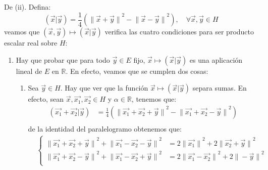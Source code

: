 \documentclass[12pt]{report}
\newcounter{it}
\theoremstyle{largebreak}
\newcommand\pint[2]{\ensuremath{\left(#1\big|#2\right)}}
\newcommand\norm[1]{\ensuremath{\|#1\|}}
\begin{document}
\begin{sol}
        De (ii). Defina:
        \begin{equation*}
            \pint{\vec{x}}{\vec{y}}=\frac{1}{4}\left(\norm{\vec{x}+\vec{y}}^2-\norm{\vec{x}-\vec{y}}^2 \right),\quad\forall\vec{x},\vec{y}\in H
        \end{equation*}
        veamos que $(\vec{x},\vec{y})\mapsto\pint{\vec{x}}{\vec{y}}$ verifica las cuatro condiciones para ser producto escalar real sobre $H$:
        \begin{enumerate}
            \item Hay que probar que para todo $\vec{y}\in E$ fijo, $\vec{x}\mapsto\pint{\vec{x}}{\vec{y}}$ es una aplicación lineal de $E$ en $\mathbb{R}$. En efecto, veamos que se cumplen dos cosas:
            \begin{enumerate}
                \item Sea $\vec{y}\in H$. Hay que ver que la función $\vec{x}\mapsto\pint{\vec{x}}{\vec{y}}$ separa sumas. En efecto, sean $\vec{x},\vec{x_1},\vec{x_2}\in H$ y $\alpha\in\mathbb{R}$, tenemos que:
                \begin{equation*}
                    \begin{split}
                        \pint{\vec{x_1}+\vec{x_2}}{\vec{y}}&=\frac{1}{4}\left(\norm{\vec{x_1}+\vec{x_2}+\vec{y}}^2-\norm{\vec{x_1}+\vec{x_2}-\vec{y}}^2 \right)\\
                    \end{split}
                \end{equation*}
                de la identidad del paralelogramo obtenemos que:
                \begin{equation*}
                    \begin{split}
                        &\left\{
                            \begin{array}{rl}
                                \norm{\vec{x_1}+\vec{x_2}+\vec{y}}^2+\norm{\vec{x_1}-\vec{x_2}-\vec{y}}^2&=2\norm{\vec{x_1}}^2+2\norm{\vec{x_2}+\vec{y}}^2\\
                                \norm{\vec{x_1}+\vec{x_2}-\vec{y}}^2+\norm{\vec{x_1}-\vec{x_2}+\vec{y}}^2&=2\norm{\vec{x_1}-\vec{x_2}}^2+2\norm{-\vec{y}}^2\\
                            \end{array}
                        \right.\\
                    \end{split}
                \end{equation*}

\end{enumerate}
\end{enumerate}
\end{sol}
\end{document}
